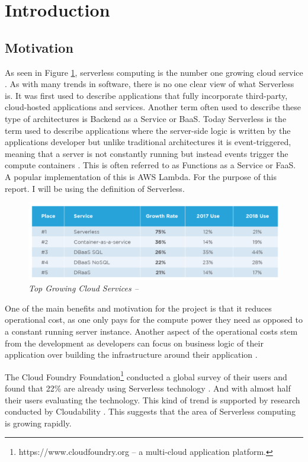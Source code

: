 \section{Introduction}
\subsection{Motivation}
\label{sub:motivation}
As seen in Figure \ref{img:strend}, serverless computing is the number one growing cloud service \citep{survey_2018}. As with many trends in software, there is no one clear view of what \gls{Serverless} is. It was first used to describe applications that fully incorporate  third-party, cloud-hosted applications and services. Another term often used to describe these type of architectures is Backend as a Service or \gls{BaaS}. Today \gls{Serverless} is the term used to describe applications where the server-side logic is written by the applications developer but unlike traditional architectures it is event-triggered, meaning that a server is not constantly running but instead events trigger the compute containers \citep{Martin.Fowler}. This is often referred to as Functions as a Service or \gls{FaaS}. A popular implementation of this is \gls{AWS Lambda}. For the purpose of this report. I will be using the \citep{Martin.Fowler} definition of \gls{Serverless}.

\begin{figure}[!ht]
\centering
\includegraphics*[width=1\textwidth]{images/a1.png}
\caption{\em Top Growing Cloud Services -- \cite{survey_2018}}
\label{img:strend}
\end{figure}

One of the main benefits and motivation for the project is that it reduces operational cost, as one only pays for the compute power they need as opposed to a constant running server instance. Another aspect of the operational costs stem from the development as developers can focus on business logic of their application over building the infrastructure around their application \citep{Martin.Fowler}. 

The \gls{Cloud Foundry Foundation}\footnote{https://www.cloudfoundry.org -- a multi-cloud application platform.} conducted a global survey of their users and found that 22\% are already using \gls{Serverless} technology \citep{foundry_2018}. And with almost half their users evaluating the technology. This kind of trend is supported by research conducted by Cloudability \citep{report:cloudability}. This suggests that the area of \gls{Serverless} computing is growing rapidly.


